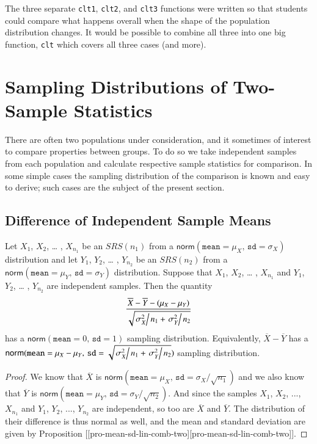 \documentclass[captions=tableheading]{scrbook}
\begin{document}
The three separate \texttt{clt1}, \texttt{clt2}, and \texttt{clt3} functions were written so that students could compare what happens overall when the shape of the population distribution changes. It would be possible to combine all three into one big function, \texttt{clt} which covers all three cases (and more). 
\section{Sampling Distributions of Two-Sample Statistics}
\label{sec-8-4}
\label{sec-Samp-Dist-Two-Samp}


There are often two populations under consideration, and it sometimes of interest to compare properties between groups. To do so we take independent samples from each population and calculate respective sample statistics for comparison. In some simple cases the sampling distribution of the comparison is known and easy to derive; such cases are the subject of the present section.
\subsection{Difference of Independent Sample Means}
\label{sec-8-4-1}


\begin{prop}
Let \(X_{1}\), \(X_{2}\), \ldots{} , \(X_{n_{1}}\) be an \(SRS(n_{1})\) from a \(\mathsf{norm}(\mathtt{mean}=\mu_{X},\,\mathtt{sd}=\sigma_{X})\) distribution and let \(Y_{1}\), \(Y_{2}\), \ldots{} , \(Y_{n_{2}}\) be an \(SRS(n_{2})\) from a \(\mathsf{norm}(\mathtt{mean}=\mu_{Y},\,\mathtt{sd}=\sigma_{Y})\) distribution. Suppose that \(X_{1}\), \(X_{2}\), \ldots{} , \(X_{n_{1}}\) and \(Y_{1}\), \(Y_{2}\), \ldots{} , \(Y_{n_{2}}\) are independent samples. Then the quantity
\begin{equation}
\frac{\overline{X}-\overline{Y}-(\mu_{X}-\mu_{Y})}{\sqrt{\left.\sigma_{X}^{2}\right/ n_{1}+\left.\sigma_{Y}^{2}\right/ n_{2}}}\label{eq-diff-indep-sample-means}\end{equation}
has a \(\mathsf{norm}(\mathtt{mean}=0,\,\mathtt{sd}=1)\) sampling distribution. Equivalently, \(\overline{X}-\overline{Y}\) has a \(\mathsf{norm}(\mathtt{mean}=\mu_{X}-\mu_{Y},\,\mathtt{sd}=\sqrt{\left.\sigma_{X}^{2}\right/ n_{1}+\left.\sigma_{Y}^{2}\right/ n_{2}})\) sampling distribution.
\end{prop}

\begin{proof}
We know that \(\overline{X}\) is \(\mathsf{norm}(\mathtt{mean}=\mu_{X},\,\mathtt{sd}=\sigma_{X}/\sqrt{n_{1}})\) and we also know that \(\overline{Y}\) is \(\mathsf{norm}(\mathtt{mean}=\mu_{Y},\,\mathtt{sd}=\sigma_{Y}/\sqrt{n_{2}})\). And since the samples \(X_{1}\), \(X_{2}\), ..., \(X_{n_{1}}\) and \(Y_{1}\), \(Y_{2}\), ..., \(Y_{n_{2}}\) are independent, so too are \(\overline{X}\) and \(\overline{Y}\). The distribution of their difference is thus normal as well, and the mean and standard deviation are given by Proposition [[pro-mean-sd-lin-comb-two][pro-mean-sd-lin-comb-two]].
\end{proof}
\end{document}
